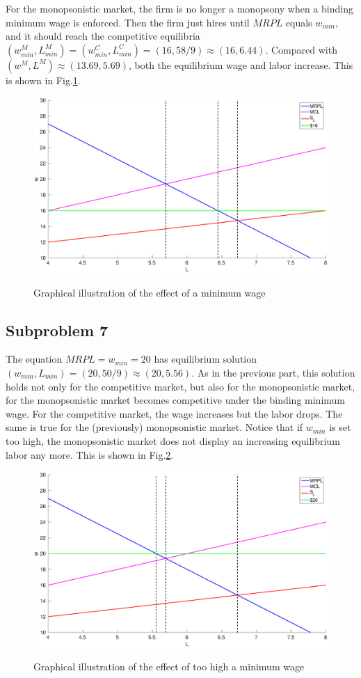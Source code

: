 \documentclass{article}
\begin{document}
For the monopsonistic market, the firm is no longer a monopsony when a binding minimum wage is enforced. Then the firm just hires until $MRPL$ equals $w_{min}$, and it should reach the competitive equilibria $(w_{min}^M,L_{min}^M)=(w_{min}^C,L_{min}^C)=(16,58/9)\approx(16,6.44)$. Compared with $(w^M,L^M)\approx(13.69,5.69)$, both the equilibrium wage and labor increase. This is shown in Fig.\ref{fig3}.
\begin{figure}[!htbp]
	\centering
	\includegraphics[width=12cm]{fig3.eps}\\
	\caption{Graphical illustration of the effect of a minimum wage}\label{fig3}
\end{figure}

\subsection{Subproblem 7}
The equation $MRPL=w_{min}=20$ has equilibrium solution $(w_{min},L_{min})=(20,50/9)\approx(20,5.56)$. As in the previous part, this solution holds not only for the competitive market, but also for the monopsonistic market, for the monopsonistic market becomes competitive under the binding minimum wage. For the competitive market, the wage increases but the labor drops. The same is true for the (previously) monopsonistic market. Notice that if $w_{min}$ is set too high, the monopsonistic market does not display an increasing equilibrium labor any more. This is shown in Fig.\ref{fig4}.
\begin{figure}[!htbp]
	\centering
	\includegraphics[width=12cm]{fig4.eps}\\
	\caption{Graphical illustration of the effect of too high a minimum wage}\label{fig4}
\end{figure}
\end{document}

